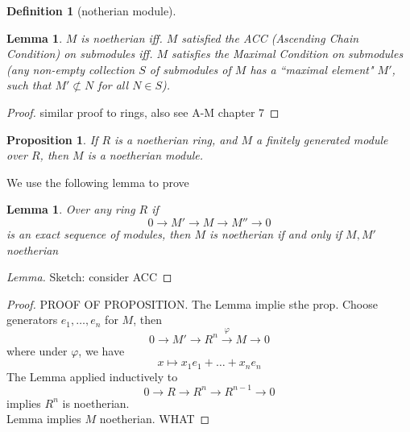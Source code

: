 \documentclass[12pt]{article}
\newtheorem{lemma}[theorem]{Lemma}
\newtheorem{prop}[theorem]{Proposition}
\theoremstyle{definition}
\newtheorem{definition}[theorem]{Definition}
\begin{document}
\begin{definition}[notherian module]

\end{definition}
\begin{lemma}
$M$ is noetherian iff. $M$ satisfied the ACC (Ascending Chain Condition) on submodules iff. $M$ satisfies the Maximal Condition on submodules (any non-empty collection $S$ of submodules of $M$ has a ``maximal element" $M'$, such that $M' \not \subset N$ for all $N\in S$).
\end{lemma}
\begin{proof}
similar proof to rings, also see A-M chapter 7
\end{proof}
\begin{prop}
If $R$ is a noetherian ring, and $M$ a finitely generated module over $R$, then $M$ is a noetherian module.
\end{prop}
We use the following lemma to prove
\begin{lemma}
Over any ring $R$ if 
\[
0\rightarrow M' \rightarrow M \rightarrow M'' \rightarrow 0
\]
is an exact sequence of modules, then $M$ is noetherian if and only if $M,M'$ noetherian
\end{lemma}
\begin{proof} [Lemma]
Sketch: consider ACC
\end{proof}
\begin{proof}
PROOF OF PROPOSITION. The Lemma implie sthe prop. Choose generators $e_1, \dots , e_n$ for $M$, then
\[
0 \rightarrow M' \rightarrow R^n \xrightarrow{\varphi} M \rightarrow 0
\]
where under $\varphi$, we have
\[
x \mapsto x_1e_1+ \dots + x_ne_n
\]
The Lemma applied inductively to 
\[
0 \rightarrow R \rightarrow R^n \rightarrow R^{n-1} \rightarrow 0
\]
implies $R^n$ is noetherian. \\
Lemma implies $M$ noetherian.
WHAT
\end{proof}
\end{document}
